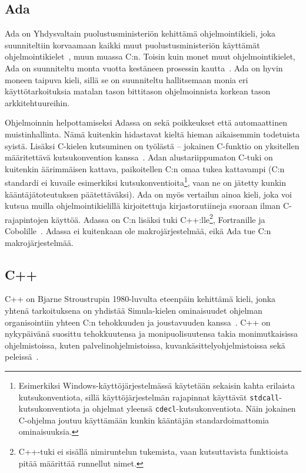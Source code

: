 \subsection{Ada}

Ada on Yhdysvaltain puolustusministeriön kehittämä ohjelmointikieli, joka
suunniteltiin korvaamaan kaikki muut puolustusministeriön käyttämät
ohjelmointikielet~\citep{adahistory}, muun muassa C:n. Toisin kuin monet muut
ohjelmointikielet, Ada on suunniteltu monta vuotta kestäneen prosessin
kautta~\citep[s.~121]{theoryandpractice}. Ada on hyvin moneen taipuva kieli,
sillä se on suunniteltu hallitsemaan monia eri käyttötarkoituksia matalan tason
bittitason ohjelmoinnista korkean tason arkkitehtuureihin.

Ohjelmoinnin helpottamiseksi Adassa on sekä poikkeukset että automaattinen
muistinhallinta. Nämä kuitenkin hidastavat kieltä hieman aikaisemmin todetuista
syistä. Lisäksi C-kielen kutsuminen on työlästä  -- jokainen C-funktio on
yksitellen määritettävä kutsukonvention
kanssa~\citep[s.~471]{ADA12}. Adan alustariippumaton C-tuki on kuitenkin
äärimmäisen kattava, paikoitellen C:n omaa tukea kattavampi (C:n standardi ei
kuvaile esimerkiksi kutsukonventioita\footnote{Esimerkiksi
Windows-käyttöjärjestelmässä käytetään sekaisin kahta erilaista
kutsukonventiota, sillä käyttöjärjestelmän rajapinnat käyttävät
\texttt{stdcall}-kutsukonventiota ja ohjelmat yleensä
\texttt{cdecl}-kutsukonventiota. Näin jokainen C-ohjelma joutuu käyttämään
kunkin kääntäjän standardoimattomia ominaisuuksia.}, vaan ne on jätetty kunkin
kääntäjätoteutuksen päätettäväksi). Ada on myös vertailun ainoa kieli, joka voi
kutsua muilla ohjelmointikielillä kirjoitettuja kirjastorutiineja suoraan ilman
C-rajapintojen käyttöä. Adassa on C:n lisäksi tuki C++:lle\footnote{C++-tuki ei
sisällä nimiruntelun tukemista, vaan kutsuttavista funktioista pitää määrittää
runnellut nimet.}, Fortranille ja Cobolille~\citep[s.~585]{ADA12}. Adassa ei
kuitenkaan ole makrojärjestelmää, eikä Ada tue C:n makrojärjestelmää.

\subsection{C++}

C++ on Bjarne Stroustrupin 1980-luvulta eteenpäin kehittämä kieli, jonka
yhtenä tarkoituksena on yhdistää Simula-kielen ominaisuudet ohjelman
organisointiin yhteen C:n tehokkuuden ja joustavuuden
kanssa~\citep{cpphistory}. C++ on nykypäivänä suosittu tehokkuutensa ja
monipuolisuutensa takia monimutkaisissa ohjelmistoissa, kuten
palvelinohjelmistoissa, kuvankäsittelyohjelmistoissa sekä
peleissä~\citep{cppapps}.

